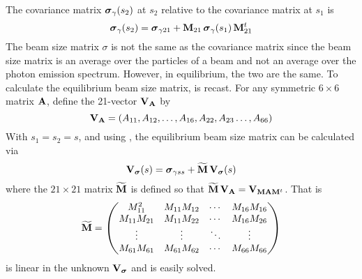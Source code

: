 The covariance matrix ${\boldsymbol{\sigma}}_\gamma(s_2)$ at $s_2$ relative to the covariance matrix at $s_1$ is
\begin{equation}
  {\boldsymbol{\sigma}}_\gamma(s_2) = {\boldsymbol{\sigma}}_{\gamma21} + {\bf M}_{21} \, {\boldsymbol{\sigma}}_\gamma(s_1) \, {\bf M}_{21}^t
  \label{ssmsm}
\end{equation}
The beam size matrix $\sigma$ is not the same as the covariance matrix since the beam size matrix is
an average over the particles of a beam and not an average over the photon emission
spectrum. However, in equilibrium, the two are the same. To calculate the equilibrium beam size
matrix,  is recast. For any symmetric $6\times6$ matrix ${\bf A}$, define the 21-vector
${\bf V}_{\bf A}$ by
\begin{equation}
  {\bf V}_{\bf A} = (A_{11}, A_{12}, \ldots, A_{16}, A_{22}, A_{23} \ldots, A_{66})
\end{equation}
With $s_1 = s_2 = s$, and using , the equilibrium beam size matrix can be calculated via
\begin{equation}
  {\bf V}_{\boldsymbol{\sigma}}(s) = {\boldsymbol{\sigma}}_{\gamma ss} + \widetilde{{\bf M}} \, {\bf V}_{\boldsymbol{\sigma}}(s)
  \label{vsmv}
\end{equation}
where the $21\times21$ matrix $\widetilde{{\bf M}}$ is defined so that $\widetilde{{\bf M}} \, {\bf V}_{\bf A} =
{\bf V}_{{\bf M}{\bf A}{\bf M}^t}$. That is
\begin{equation}
  \widetilde{{\bf M}} = \begin{pmatrix}
    M_{11}^2      & M_{11} M_{12} & \cdots & M_{16} M_{16} \\
    M_{11} M_{21} & M_{11} M_{22} & \cdots & M_{16} M_{26} \\
    \vdots        & \vdots        & \ddots & \vdots        \\
    M_{61} M_{61} & M_{61} M_{62} & \cdots & M_{66} M_{66}
  \end{pmatrix}
\end{equation}
 is linear in the unknown ${\bf V}_{\boldsymbol{\sigma}}$ and is easily solved.

